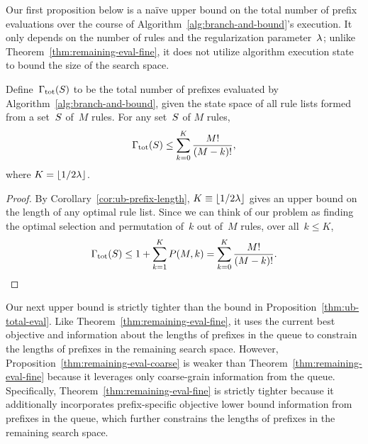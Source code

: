 Our first proposition below is a na\"ive upper bound on
the total number of prefix evaluations over the course of
Algorithm~\ref{alg:branch-and-bound}'s execution.
%
It only depends on the number of rules and
the regularization parameter~${\lambda}$;
\ie unlike Theorem~\ref{thm:remaining-eval-fine},
it does not utilize algorithm execution state to
bound the size of the search space.

\begin{proposition}
\label{thm:ub-total-eval}
Define~${\Gamma_{\textnormal{tot}}}(S)$ to be the total number of prefixes
evaluated by Algorithm~\ref{alg:branch-and-bound}, given the state space of
all rule lists formed from a set~$S$ of~$M$ rules.
%
For any set~$S$ of $M$ rules,
\begin{align}
\TotalRemaining(\RuleSet) \le \sum_{k=0}^K \frac{M!}{(M - k)!},
\label{eq:size-naive}
\end{align}
where ${K = \lfloor 1/2 {\lambda} \rfloor}$.
\end{proposition}

\begin{proof}
By Corollary~\ref{cor:ub-prefix-length},
${K \equiv \lfloor 1 / 2 {\lambda} \rfloor}$
gives an upper bound on the length of any optimal rule list.
%
Since we can think of our problem as finding the optimal
selection and permutation of~$k$ out of~$M$ rules,
over all~${k \le K}$,
\begin{align}
\TotalRemaining(\RuleSet) \le 1 + \sum_{k=1}^K P(M, k)
= \sum_{k=0}^K \frac{M!}{(M - k)!}.
\end{align}
\end{proof}

Our next upper bound is strictly tighter than the bound in
Proposition~\ref{thm:ub-total-eval}.
%
Like Theorem~\ref{thm:remaining-eval-fine}, it uses the
current best objective and information about
the lengths of prefixes in the queue to constrain
the lengths of prefixes in the remaining search space.
%
However, Proposition~\ref{thm:remaining-eval-coarse}
is weaker than Theorem~\ref{thm:remaining-eval-fine} because
it leverages only coarse-grain information from the queue.
%
Specifically, Theorem~\ref{thm:remaining-eval-fine} is
strictly tighter because it additionally incorporates
prefix-specific objective lower bound information from
prefixes in the queue, which further constrains
the lengths of prefixes in the remaining search space.

